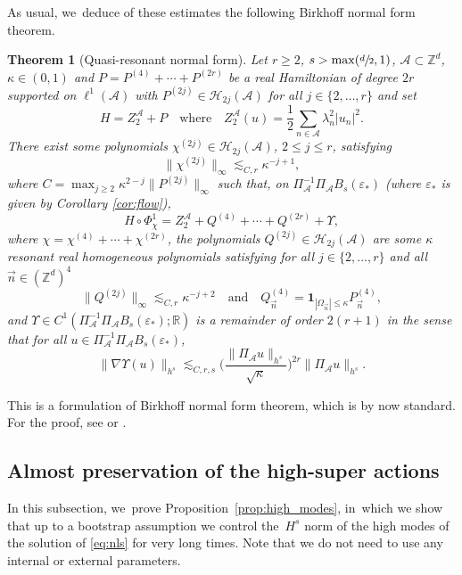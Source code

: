 \documentclass[JEP,XML,SOM,Unicode,published]{cedram}
\theoremstyle{plain}
\newtheorem{theorem}{Theorem}[section]
\theoremstyle{definition}
\newcommand{\1}{\mathbf{1}}
\begin{document}
As usual, we~deduce of these estimates the following Birkhoff normal form theorem.
\begin{theorem}[Quasi-resonant normal form]
\label{thm:res-nf} Let $r\geq2$, $s> \max(\sfrac{d}{2},1)$, $\mathcal{A} \subset \mathbb{Z}^d$, $\kappa \in (0,1)$ and $P = P^{(4)} + \cdots + P^{(2r)}$ be a real Hamiltonian of degree $2r$ supported on $\ell^1(\mathcal{A})$ with $P^{(2j)} \in \mathcal{H}_{2j}(\mathcal{A})$ for all $j\in \{ 2,\dots,r \}$ and set
\[
H = Z_2^{\mathcal{A}} + P \quad \mathrm{where } \quad Z_2^{\mathcal{A}}(u) = \frac12\sum_{n\in \mathcal{A}} \lambda_n^2 |u_n|^2.
\]
There exist some polynomials $\chi^{(2j)} \in \mathcal{H}_{2j}(\mathcal{A})$, $2\leq j \leq r$, satisfying
\[
\| \chi^{(2j)} \|_{\infty} \lesssim_{ C,r} \kappa^{-j+1},
\]
where $C = \max_{j\geq 2} \kappa^{2-j}\| P^{(2j)} \|_{\infty}$ such that, on $\Pi_{\mathcal{A}}^{-1}\Pi_{\mathcal{A}}B_s(\varepsilon_*) $ (where $\varepsilon_*$ is given by Corollary \ref{cor:flow}),
\[
H\circ \Phi_{\chi}^1 = Z_2^{\mathcal{A}} + Q^{(4)} + \cdots+ Q^{(2r)} + \Upsilon,
\]
where $\chi = \chi^{(4)} + \cdots + \chi^{(2r)}$, the polynomials $Q^{(2j)} \in \mathcal{H}_{2j}(\mathcal{A})$ are some $\kappa$ resonant real homogeneous polynomials satisfying for all $j\in \{2,\dots,r\}$ and all $\vec{n} \in (\mathbb{Z}^d)^4$
\[
\| Q^{(2j)} \|_{\infty} \lesssim_{C,r} \kappa^{-j+2} \quad \mathrm{and} \quad Q^{(4)}_{\vec{n}} = \mathbf{1}_{|\Omega_{\vec{n}}| \leq \kappa} P^{(4)}_{\vec{n}},
\]
and $\Upsilon \in C^1(\Pi_{\mathcal{A}}^{-1}\Pi_{\mathcal{A}}B_s(\varepsilon_*);\mathbb{R})$ is a remainder of order $2(r+1)$ in the sense that for all $u\in \Pi_{\mathcal{A}}^{-1}\Pi_{\mathcal{A}}B_s(\varepsilon_*)$,
\begin{equation}
\label{eq:R-res}
\|\nabla \Upsilon(u)\|_{h^{s}}\lesssim_{C,r,s} \Big(\frac{\| \Pi_{\mathcal{A}} u\|_{h^{s}}}{\sqrt{\kappa}} \Big)^{2r}\|\Pi_{\mathcal{A}} u\|_{h^{s}}.
\end{equation}
\end{theorem}
This is a formulation of Birkhoff normal form theorem, which is by now standard. For the proof, see \cite[Th.\,2.15]{BG22} or \cite[Th.\,2.12]{BGR23}.

\subsection{Almost preservation of the high-super actions}
In this subsection, we~prove Proposition~\ref{prop:high_modes}, in~which we show that up to a bootstrap assumption we control the~$H^s$ norm of the high modes of the solution of \eqref{eq:nls} for very long times. Note that we do not need to use any internal or external parameters.
\end{document}
